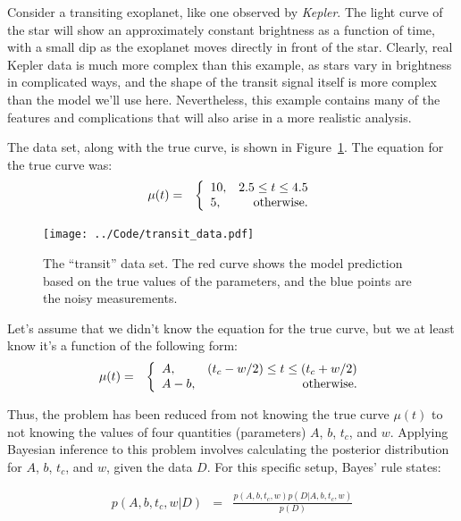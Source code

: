 Consider a transiting exoplanet, like
one observed by {\it Kepler}. The light curve of the star will show an
approximately constant brightness as a function of time, with a small dip as
the exoplanet moves directly in front of the star. Clearly, real Kepler data
is much more complex than this example, as stars vary in brightness in
complicated ways, and the shape of the transit signal itself is more complex
than the model we'll use here. Nevertheless, this example contains many of the
features and complications that will also arise in a more realistic analysis.

The data set, along with the true curve, is shown in 
Figure~\ref{fig:transit_data}. The equation for the true curve was:
\begin{eqnarray*}
\mu(t) &=& \left\{
\begin{array}{lr}
10, & 2.5 \leq t \leq 4.5\\
5,  & \textnormal{otherwise}.
\end{array}
\right.
\end{eqnarray*}

\begin{figure}
\begin{center}
\texttt{[image: ../Code/transit\_data.pdf]}
\caption{The ``transit'' data set. The red curve shows the model prediction
based on the true values of the parameters, and the blue points are the
noisy measurements.\label{fig:transit_data}}
\end{center}
\end{figure}

Let's assume that we didn't know the equation for the true curve,
but we at least know it's a function of the following form:
\begin{eqnarray*}
\mu(t) &=& \left\{
\begin{array}{lr}
A, & (t_c - w/2) \leq t \leq (t_c + w/2)\\
A-b,  & \textnormal{otherwise}.
\end{array}
\right.
\end{eqnarray*}

Thus, the problem has been reduced from not knowing the true curve $\mu(t)$
to not knowing the values of four quantities (parameters)
$A$, $b$, $t_c$, and $w$. Applying Bayesian inference to this problem
involves calculating the posterior distribution for $A$, $b$, $t_c$, and $w$,
given the data $D$. For this specific setup, Bayes' rule states:

\begin{eqnarray}
p(A, b, t_c, w | D) &=& \frac{p(A, b, t_c, w)p(D | A, b, t_c, w)}{p(D)}
\end{eqnarray}


